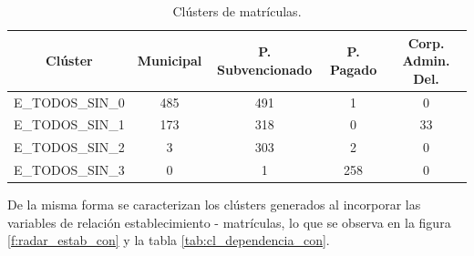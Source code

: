 \begin{table}[H]
\centering
\caption{Clústers de matrículas.}
\label{tab:cl_dependencia_sin}
\begin{tabular}{|c|c|c|c|c|}
\hline
\textbf{Clúster} & \textbf{Municipal} & \textbf{P. Subvencionado} & \textbf{P. Pagado} & \textbf{Corp. Admin. Del.}   \\ \hline
E\_TODOS\_SIN\_0 & 485 & 491 & 1 & 0 \\ \hline
E\_TODOS\_SIN\_1 & 173 & 318 & 0 & 33 \\ \hline
E\_TODOS\_SIN\_2 & 3 & 303 & 2 & 0 \\ \hline
E\_TODOS\_SIN\_3 & 0 & 1 & 258 & 0 \\ \hline
\end{tabular}
\end{table}

De la misma forma se caracterizan los clústers generados al incorporar las variables de relación establecimiento - matrículas, lo que se observa en la figura \ref{f:radar_estab_con} y la tabla \ref{tab:cl_dependencia_con}.

